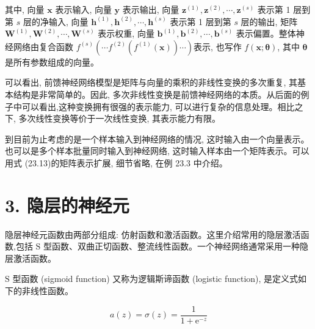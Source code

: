 \documentclass[10pt]{article}
\begin{document}
\begin{CJK*}{UTF8}{bsmi}
其中, 向量 $\boldsymbol{x}$ 表示输入, 向量 $\boldsymbol{y}$ 表示输出, 向量 $\boldsymbol{z}^{(1)}, \boldsymbol{z}^{(2)}, \cdots, \boldsymbol{z}^{(s)}$ 表示第 1 层到第 $s$ 层的净输入, 向量 $\boldsymbol{h}^{(1)}, \boldsymbol{h}^{(2)}, \cdots, \boldsymbol{h}^{(s)}$ 表示第 1 层到第 $s$ 层的输出, 矩阵 $\boldsymbol{W}^{(1)}, \boldsymbol{W}^{(2)}, \cdots, \boldsymbol{W}^{(s)}$ 表示权重, 向量 $\boldsymbol{b}^{(1)}, \boldsymbol{b}^{(2)}, \cdots, \boldsymbol{b}^{(s)}$ 表示偏置。整体神经网络由复合函数 $f^{(s)}\left(\cdots f^{(2)}\left(f^{(1)}(\boldsymbol{x})\right) \cdots\right)$表示, 也写作 $f(\boldsymbol{x} ; \boldsymbol{\theta})$, 其中 $\boldsymbol{\theta}$ 是所有参数组成的向量。

可以看出, 前馈神经网络模型是矩阵与向量的乘积的非线性变换的多次重复, 其基本结构是非常简单的。因此, 多次非线性变换是前馈神经网络的本质。从后面的例子中可以看出,这种变换拥有很强的表示能力, 可以进行复杂的信息处理。相比之下, 多次线性变换等价于一次线性变换, 其表示能力有限。

到目前为止考虑的是一个样本输入到神经网络的情况, 这时输入由一个向量表示。也可以是多个样本批量同时输入到神经网络, 这时输入样本由一个矩阵表示。可以用式 (23.13)的矩阵表示扩展, 细节省略, 在例 23.3 中介绍。

\section*{3. 隐层的神经元}
隐层神经元函数由两部分组成: 仿射函数和激活函数。这里介绍常用的隐层激活函数,包括 $\mathrm{S}$ 型函数、双曲正切函数、整流线性函数。一个神经网络通常采用一种隐层激活函数。

$\mathrm{S}$ 型函数 (sigmoid function) 又称为逻辑斯谛函数 (logistic function), 是定义式如下的非线性函数。


\begin{equation*}
a(z)=\sigma(z)=\frac{1}{1+\mathrm{e}^{-z}} \tag{23.14}
\end{equation*}



\end{CJK*}
\end{document}

